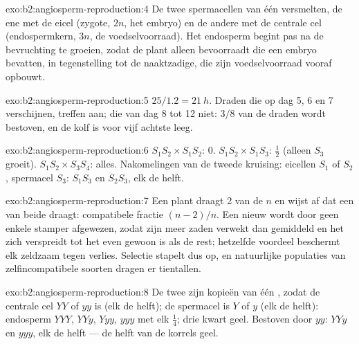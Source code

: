 \begin{solution}{exo:b2:angiosperm-reproduction:4}
De twee spermacellen van één  versmelten, de ene met de eicel
(zygote, $2n$, het embryo) en de andere met de centrale cel (endospermkern,
$3n$, de voedselvoorraad). Het endosperm begint pas na de bevruchting te
groeien, zodat de plant alleen  bevoorraadt die een embryo
bevatten, in tegenstelling tot de naaktzadige, die zijn voedselvoorraad
vooraf opbouwt.
\end{solution}

\begin{solution}{exo:b2:angiosperm-reproduction:5}
$25/1.2 = \qty{21}{h}$. Draden die op dag 5, 6 en 7 verschijnen, treffen
 aan; die van dag 8 tot 12 niet: $3/8$ van de draden wordt
bestoven, en de kolf is voor vijf achtste leeg.
\end{solution}

\begin{solution}{exo:b2:angiosperm-reproduction:6}
$S_1S_2\times S_1S_2$: 0. $S_1S_2\times S_1S_3$: $\tfrac12$ (alleen
 $S_3$ groeit). $S_1S_2\times S_3S_4$: alles. Nakomelingen van de
tweede kruising: eicellen $S_1$ of $S_2$, spermacel $S_3$: $S_1S_3$ en
$S_2S_3$, elk de helft.
\end{solution}

\begin{solution}{exo:b2:angiosperm-reproduction:7}
Een plant draagt 2 van de $n$  en wijst  af dat een van
beide draagt: compatibele fractie $(n - 2)/n$. Een nieuw  wordt door
geen enkele stamper afgewezen, zodat zijn  meer zaden verwekt dan
gemiddeld en het zich verspreidt tot het even gewoon is als de rest;
hetzelfde voordeel beschermt elk zeldzaam  tegen verlies. Selectie
stapelt dus  op, en natuurlijke populaties van zelfincompatibele
soorten dragen er tientallen.
\end{solution}

\begin{solution}{exo:b2:angiosperm-reproduction:8}
De twee  zijn kopieën van één , zodat de centrale cel
$YY$ of $yy$ is (elk de helft); de spermacel is $Y$ of $y$ (elk de
helft): endosperm $YYY$, $YYy$, $Yyy$, $yyy$ met elk $\tfrac14$; drie
kwart geel. Bestoven door $yy$: $YYy$ en $yyy$, elk de helft --- de helft
van de korrels geel.
\end{solution}

